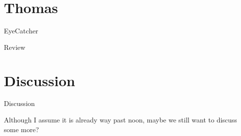 \documentclass[aspectratio=169,10pt]{beamer}
\begin{document}
\section{Thomas}
\begin{frame}[fragile]{EyeCatcher}
\end{frame}
\begin{frame}[t,fragile]{Review}
\end{frame}


\section{Discussion}
\begin{frame}[standout]{Discussion}
\begin{center}
    \LARGE{Although I assume it is already way past noon, maybe we still want to discuss some more?}
\end{center}
\end{frame}
\end{document}
